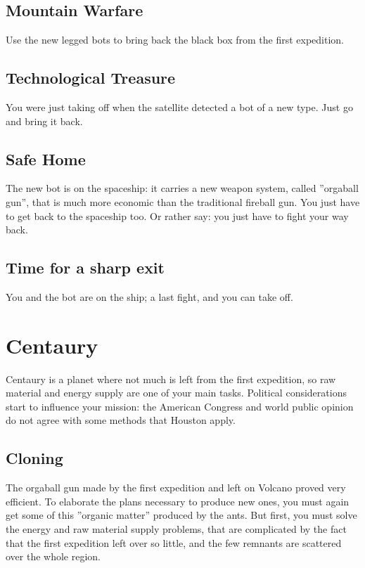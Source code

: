 \subsection{Mountain Warfare}

Use the new legged bots to bring back the black box from the first expedition.


\subsection{Technological Treasure}

You were just taking off when the satellite detected a bot of a new type. Just go and bring it back.


\subsection{Safe Home}

The new bot is on the spaceship: it carries a new weapon system, called ''orgaball gun'', that is much more economic than the traditional fireball gun. You just have to get back to the spaceship too. Or rather say: you just have to fight your way back.


\subsection{Time for a sharp exit}

You and the bot are on the ship; a last fight, and you can take off.


\section{Centaury}

Centaury is a planet where not much is left from the first expedition, so raw material and energy supply are one of your main tasks. Political considerations start to influence your mission: the American Congress and world public opinion do not agree with some methods that Houston apply.


\subsection{Cloning}

The orgaball gun made by the first expedition and left on Volcano proved very efficient. To elaborate the plans necessary to produce new ones, you must again get some of this ''organic matter'' produced by the ants. But first, you must solve the energy and raw material supply problems, that are complicated by the fact that the first expedition left over so little, and the few remnants are scattered over the whole region.


